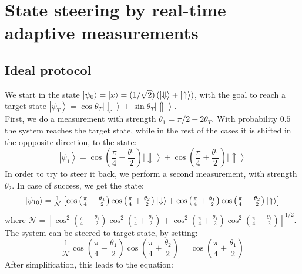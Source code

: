 \section{State steering by real-time adaptive measurements}
\subsection{Ideal protocol}
We start in the state $\left| \psi_0 \right \rangle = \left|x\right> = (1/\sqrt{2}) \left(\left| \Downarrow \right \rangle + \left| \Uparrow \right \rangle \right)$, with the goal to reach a target state $\left| \psi_T \right \rangle = \cos\theta_T \left| \Downarrow \right \rangle + \sin\theta_T \left| \Uparrow \right \rangle$.\\
First, we do a measurement with strength $\theta_1 = \pi/2-2\theta_T$. With probability $0.5$ the system reaches the target state, while in the rest of the cases it is shifted in the oppposite direction, to the state:
\begin{equation}
\left| \psi_1 \right \rangle = \cos \left( \frac{\pi}{4} - \frac{\theta_1}{2} \right) \left| \Downarrow \right \rangle + \cos \left( \frac{\pi}{4} + \frac{\theta_1}{2} \right) \left| \Uparrow \right \rangle
\end{equation}
In order to try to steer it back, we perform a second measurement, with strength $\theta_2$. In case of success, we get the state:
\begin{equation}
\resizebox{.9\hsize}{!}{$
\left| \psi_{10} \right \rangle = \frac{1}{\mathcal{N}} \left[ \cos \left( \frac{\pi}{4} - \frac{\theta_1}{2} \right)\cos \left( \frac{\pi}{4} + \frac{\theta_2}{2} \right) \left| \Downarrow \right \rangle + \cos \left( \frac{\pi}{4} + \frac{\theta_1}{2} \right)\cos \left( \frac{\pi}{4} - \frac{\theta_2}{2} \right) \left| \Uparrow \right \rangle \right]
$}
\end{equation}
where $\mathcal{N} = \left[ \cos^{2} \left( \frac{\pi}{4} - \frac{\theta_1}{2} \right)\cos^2 \left( \frac{\pi}{4} + \frac{\theta_2}{2} \right) + \cos^2 \left( \frac{\pi}{4} + \frac{\theta_1}{2} \right) \cos^2 \left( \frac{\pi}{4} - \frac{\theta_2}{2} \right) \right]^{1/2}$.
The system can be steered to target state, by setting:
\begin{equation}
 \frac{1}{\mathcal{N}} \cos \left( \frac{\pi}{4} - \frac{\theta_1}{2} \right)\cos \left( \frac{\pi}{4} + \frac{\theta_2}{2} \right) = \cos \left( \frac{\pi}{4} + \frac{\theta_1}{2} \right)
\end{equation}
After simplification, this leads to the equation:
